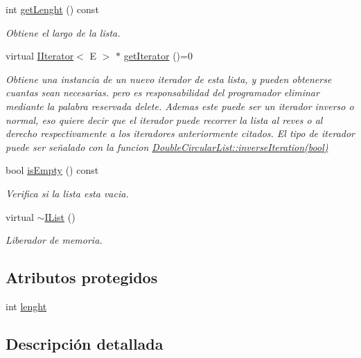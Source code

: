 \begin{DoxyCompactItemize}
int \hyperlink{classIList_a6d43df225c304c3a0abdb4c7d81274b5}{get\-Lenght} () const 
\begin{DoxyCompactList}\small\item\em Obtiene el largo de la lista. \end{DoxyCompactList}\item 
virtual \hyperlink{classIIterator}{I\-Iterator}$<$ E $>$ $\ast$ \hyperlink{classIList_a997815664cc6b20eb5dfa9968251d2cd}{get\-Iterator} ()=0
\begin{DoxyCompactList}\small\item\em Obtiene una instancia de un nuevo iterador de esta lista, y pueden obtenerse cuantas sean necesarias. pero es responsabilidad del programador eliminar mediante la palabra reservada delete. Ademas este puede ser un iterador inverso o normal, eso quiere decir que el iterador puede recorrer la lista al reves o al derecho respectivamente a los iteradores anteriormente citados. El tipo de iterador puede ser señalado con la funcion \hyperlink{classDoubleCircularList_a77212c5d6ad148c99a06009a8c44128b}{Double\-Circular\-List\-::inverse\-Iteration(bool)}\end{DoxyCompactList}\item 
bool \hyperlink{classIList_ad21f4969c574c87a4715d45496d81d5c}{is\-Empty} () const 
\begin{DoxyCompactList}\small\item\em Verifica si la lista esta vacia. \end{DoxyCompactList}\item 
\hypertarget{classIList_a6ff12f7e891ea75a5554b70ed3fa0de8}{virtual \hyperlink{classIList_a6ff12f7e891ea75a5554b70ed3fa0de8}{$\sim$\-I\-List} ()}\label{classIList_a6ff12f7e891ea75a5554b70ed3fa0de8}

\begin{DoxyCompactList}\small\item\em Liberador de memoria. \end{DoxyCompactList}\end{DoxyCompactItemize}
\subsection*{Atributos protegidos}
\begin{DoxyCompactItemize}
\item 
int \hyperlink{classIList_a64ce981ba1104bbb482068983cb5a3bc}{lenght}
\end{DoxyCompactItemize}


\subsection{Descripción detallada}
